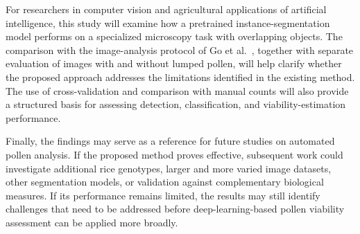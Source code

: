 For researchers in computer vision and agricultural applications of artificial intelligence, this study will examine how a pretrained instance-segmentation model performs on a specialized microscopy task with overlapping objects. The comparison with the image-analysis protocol of Go et al.~\cite{go2019}, together with separate evaluation of images with and without lumped pollen, will help clarify whether the proposed approach addresses the limitations identified in the existing method. The use of cross-validation and comparison with manual counts will also provide a structured basis for assessing detection, classification, and viability-estimation performance.

Finally, the findings may serve as a reference for future studies on automated pollen analysis. If the proposed method proves effective, subsequent work could investigate additional rice genotypes, larger and more varied image datasets, other segmentation models, or validation against complementary biological measures. If its performance remains limited, the results may still identify challenges that need to be addressed before deep-learning-based pollen viability assessment can be applied more broadly.
